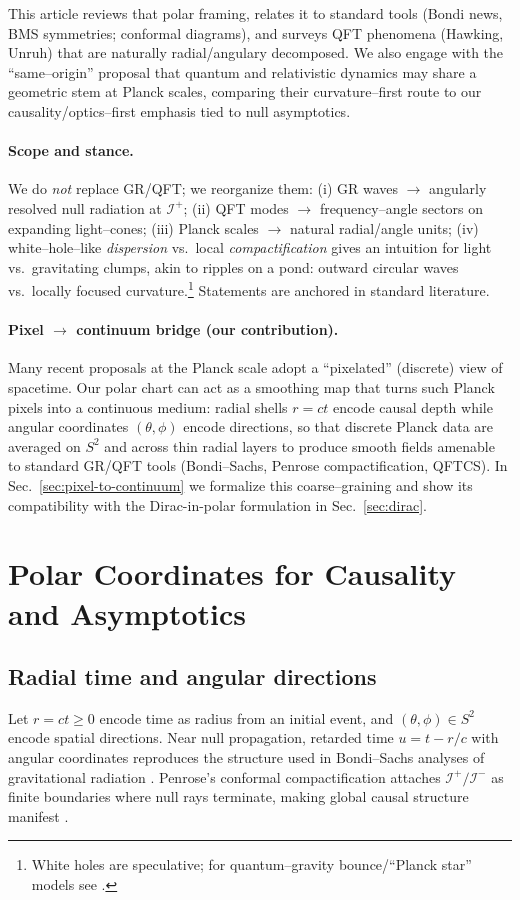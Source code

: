 \documentclass[12pt]{article}
\newcommand{\Iplus}{\mathcal{I}^+}
\newcommand{\Iminus}{\mathcal{I}^-}
\begin{document}
This article reviews that polar framing, relates it to standard tools (Bondi news, BMS symmetries; conformal diagrams), and surveys QFT phenomena (Hawking, Unruh) that are naturally radial/angulary decomposed. We also engage with the ``same–origin'' proposal \citep{SrichanGJES2025} that quantum and relativistic dynamics may share a geometric stem at Planck scales, comparing their curvature–first route to our causality/optics–first emphasis tied to null asymptotics.

\paragraph{Scope and stance.}
We do \emph{not} replace GR/QFT; we reorganize them: (i) GR waves $\to$ angularly resolved null radiation at $\Iplus$; (ii) QFT modes $\to$ frequency–angle sectors on expanding light–cones; (iii) Planck scales $\to$ natural radial/angle units; (iv) white–hole–like \emph{dispersion} vs.\ local \emph{compactification} gives an intuition for light vs.\ gravitating clumps, akin to ripples on a pond: outward circular waves vs.\ locally focused curvature.\footnote{White holes are speculative; for quantum–gravity bounce/``Planck star'' models see \citet{deLorenzo2016}.} Statements are anchored in standard literature.

\paragraph{Pixel $\to$ continuum bridge (our contribution).}
Many recent proposals at the Planck scale adopt a ``pixelated'' (discrete) view of spacetime. 
Our polar chart can act as a smoothing map that turns such Planck pixels into a continuous medium: 
radial shells $r=ct$ encode causal depth while angular coordinates $(\theta,\phi)$ encode directions, 
so that discrete Planck data are averaged on $S^2$ and across thin radial layers to produce smooth 
fields amenable to standard GR/QFT tools (Bondi--Sachs, Penrose compactification, QFTCS). 
In Sec.~\ref{sec:pixel-to-continuum} we formalize this coarse--graining and show its compatibility with the 
Dirac-in-polar formulation in Sec.~\ref{sec:dirac}.

\section{Polar Coordinates for Causality and Asymptotics}
\subsection{Radial time and angular directions}
Let $r=ct\ge 0$ encode time as radius from an initial event, and $(\theta,\phi)\in S^2$ encode spatial directions. Near null propagation, retarded time $u=t-r/c$ with angular coordinates reproduces the structure used in Bondi--Sachs analyses of gravitational radiation \citep{Bondi1962,Sachs1962,BMS}. Penrose's conformal compactification attaches $\Iplus/\Iminus$ as finite boundaries where null rays terminate, making global causal structure manifest \citep{Penrose1964,NullInfinity,AsympFlat}.
\end{document}

